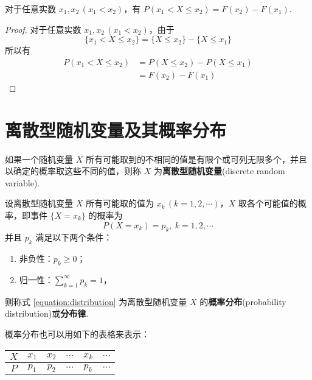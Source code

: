 \begin{property}
    \indent 对于任意实数 $x_1,x_2\, (x_1<x_2)$，有 $P(x_1 < X \leqslant x_2)=F(x_2)-F(x_1)$.
\end{property}

\begin{proof}
    对于任意实数 $x_1,x_2\, (x_1<x_2)$，由于
    $$
    \{x_1 < X \leqslant x_2\} = \{X \leqslant x_2\} - \{X \leqslant x_1\}
    $$
    所以有
    $$
    \begin{aligned}
        P(x_1 < X \leqslant x_2) &= P(X \leqslant x_2) - P(X \leqslant x_1) \\
        &= F(x_2)-F(x_1)
    \end{aligned}
    $$

    \vspace{-1.5em}
\end{proof}

\section{离散型随机变量及其概率分布}

\begin{definition}
    \indent 如果一个随机变量 $X$ 所有可能取到的不相同的值是有限个或可列无限多个，并且以确定的概率取这些不同的值，则称 $X$ 为\textbf{离散型随机变量}(discrete random variable).
\end{definition}

\begin{definition}
    \indent 设离散型随机变量 $X$ 所有可能取的值为 $x_k\, (k=1,2,\cdots)$，$X$ 取各个可能值的概率，即事件 $\{X=x_k\}$ 的概率为
    \begin{equation} \label{equation:distribution}
        P(X=x_k) = p_k, \ k=1,2,\cdots
    \end{equation}
    并且 $p_k$ 满足以下两个条件：
    \begin{enumerate}
        \item 非负性：$p_k \geqslant 0$；\vspace{0.5em}
        \item 归一性：$\displaystyle\sum_{k=1}^\infty p_k = 1$，
    \end{enumerate} \vspace{0.5em}
    则称式 \eqref{equation:distribution} 为离散型随机变量 $X$ 的\textbf{概率分布}(probability distribution)或\textbf{分布律}.
\end{definition}

概率分布也可以用如下的表格来表示：
\begin{table*}[htbp]
    \centering

    \begin{tabular}{c | c c c c c}
        \hline
        $X$ & $x_1$ & $x_2$ & $\cdots$ & $x_k$ & $\cdots$ \\
        \hline
        $P$ & $p_1$ & $p_2$ & $\cdots$ & $p_k$ & $\cdots$ \\
        \hline
    \end{tabular}
\end{table*}

